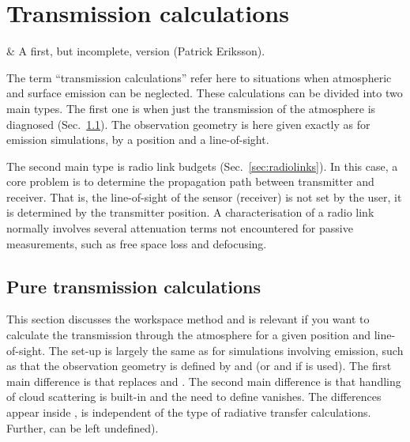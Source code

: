 \chapter{Transmission calculations}
 \label{sec:trans}


 & A first, but incomplete, version (Patrick Eriksson).\\
\stophistory

The term ``transmission calculations'' refer here to situations when
atmospheric and surface emission can be neglected. These calculations can be
divided into two main types. The first one is when just the transmission of the
atmosphere is diagnosed (Sec.~\ref{sec:transmission}). The observation geometry
is here given exactly as for emission simulations, by a position and a
line-of-sight.

The second main type is radio link budgets (Sec.~\ref{sec:radiolinks}). In this
case, a core problem is to determine the propagation path between transmitter
and receiver. That is, the line-of-sight of the sensor (receiver) is not set by
the user, it is determined by the transmitter position. A characterisation of a
radio link normally involves several attenuation terms not encountered for
passive measurements, such as free space loss and defocusing.




\section{Pure transmission calculations}
\label{sec:transmission}

This section discusses the  workspace method
and is relevant if you want to calculate the transmission through the
atmosphere for a given position and line-of-sight. The set-up is largely the
same as for simulations involving emission, such as that the observation
geometry is defined by  and  (or
 and  if  is used).
The first main difference is that  replaces
 and . The second
main difference is that handling of cloud scattering is built-in and the need
to define  vanishes. The differences appear
inside ,  is independent of the type
of radiative transfer calculations. Further,
 can be left undefined).


